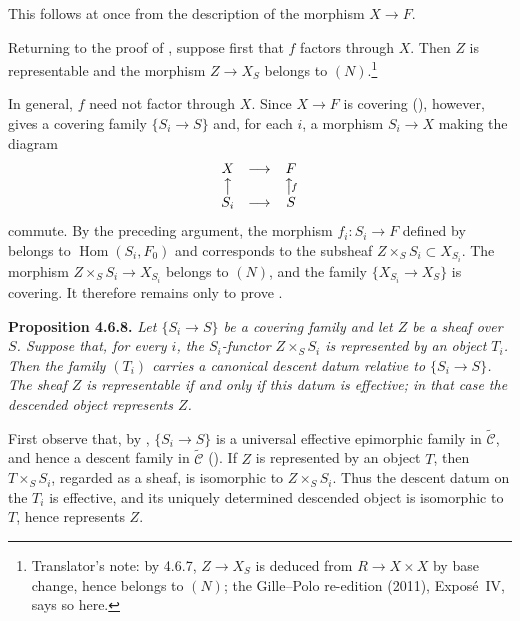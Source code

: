 This follows at once from the description of the morphism \(X\to F\).

Returning to the proof of , suppose first that \(f\) factors
through \(X\). Then \(Z\) is representable and the morphism \(Z\to X_S\)
belongs to \((N)\).\footnote{Translator's note: by 4.6.7, \(Z\to X_S\) is deduced from
\(R\to X\times X\) by base change, hence belongs to \((N)\); the Gille--Polo
re-edition (2011), Expos\'e~IV, says so here.}

In general, \(f\) need not factor through \(X\). Since \(X\to F\) is
covering (), however,  gives a covering family
\(\{S_i\to S\}\) and, for each \(i\), a morphism \(S_i\to X\) making
the diagram
\[
\begin{array}{ccc}
 X&\longrightarrow&F\cr
 \big\uparrow&&\big\uparrow\!{\scriptstyle f}\cr
 S_i&\longrightarrow&S
\end{array}
\]
commute. By the preceding argument, the morphism
\(f_i:S_i\to F\) defined by  belongs to
\(\operatorname{Hom}(S_i,F_0)\) and corresponds to the subsheaf
\(Z\times_SS_i\subset X_{S_i}\). The morphism
\(Z\times_SS_i\to X_{S_i}\) belongs to \((N)\), and the family
\(\{X_{S_i}\to X_S\}\) is covering. It therefore remains only to prove
.

\medskip
\noindent{}\textbf{Proposition 4.6.8.}
\textit{Let \(\{S_i\to S\}\) be a covering family and let \(Z\) be a
sheaf over \(S\). Suppose that, for every \(i\), the
\(S_i\)-functor \(Z\times_SS_i\) is represented by an object \(T_i\).
Then the family \((T_i)\) carries a canonical descent datum relative to
\(\{S_i\to S\}\). The sheaf \(Z\) is representable if and only if this
datum is effective; in that case the descended object represents \(Z\).}

First observe that, by , \(\{S_i\to S\}\) is a universal effective
epimorphic family in \(\widetilde{\mathscr C}\), and hence a descent
family in \(\widetilde{\mathscr C}\) (). If \(Z\) is represented by
an object \(T\), then \(T\times_SS_i\), regarded as a sheaf, is
isomorphic to \(Z\times_SS_i\). Thus the descent datum on the \(T_i\) is
effective, and its uniquely determined descended object is isomorphic to
\(T\), hence represents \(Z\).

